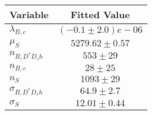 \begin{tabular}[t]{lc}
\hline
Variable &Fitted Value\\
\hline\hline
$\lambda_{B,c}$&$(-0.1\pm2.0)e-06$\\
\hline
$\mu_S$&$5279.62\pm0.57$\\
\hline
$n_{B, D^* D_s h}$&$553\pm29$\\
\hline
$n_{B,c}$&$28\pm25$\\
\hline
$n_S$&$1093\pm29$\\
\hline
$\sigma_{B, D^* D_s h}$&$64.9\pm2.7$\\
\hline
$\sigma_S$&$12.01\pm0.44$\\
\hline
\end{tabular}